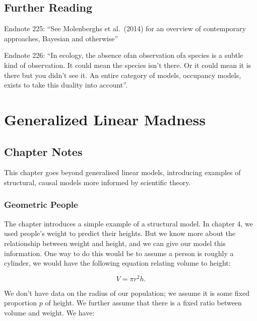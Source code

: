 \documentclass[
]{book}
\begin{document}
\hypertarget{further-reading-8}{%
\section*{Further Reading}\label{further-reading-8}}

Endnote 225: ``See Molenberghs et al.~(2014) for an overview of contemporary approaches, Bayesian and otherwise''

Endnote 226: ``In ecology, the absence ofan observation ofa species is a subtle kind of observation. It could mean the species isn't there. Or it could mean it is there but you didn't see it. An entire category of models, occupancy models, exists to take this duality into account''.

\hypertarget{generalized}{%
\chapter{Generalized Linear Madness}\label{generalized}}

\hypertarget{chapter-notes-15}{%
\section{Chapter Notes}\label{chapter-notes-15}}

This chapter goes beyond generalised linear models, introducing examples of structural, causal models more informed by scientific theory.

\hypertarget{geometric-people}{%
\subsection*{Geometric People}\label{geometric-people}}

The chapter introduces a simple example of a structural model. In chapter 4, we used people's weight to predict their heights. But we know more about the relationship between weight and height, and we can give our model this information. One way to do this would be to assume a person is roughly a cylinder, we would have the following equation relating volume to height:

\[
V = \pi r^2 h.
\]

We don't have data on the radius of our population; we assume it is some fixed proportion \(p\) of height. We further assume that there is a fixed ratio between volume and weight. We have:
\end{document}
